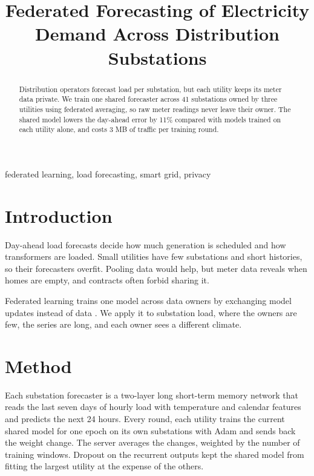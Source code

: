 \documentclass[conference]{IEEEtran}
\begin{document}
\title{Federated Forecasting of Electricity Demand Across Distribution Substations}
\author{}
\maketitle
\begin{abstract}
Distribution operators forecast load per substation, but each utility keeps its meter data private. We train one shared forecaster across 41 substations owned by three utilities using federated averaging, so raw meter readings never leave their owner. The shared model lowers the day-ahead error by 11\% compared with models trained on each utility alone, and costs 3 MB of traffic per training round.
\end{abstract}
\begin{IEEEkeywords}
federated learning, load forecasting, smart grid, privacy
\end{IEEEkeywords}
\section{Introduction}
Day-ahead load forecasts decide how much generation is scheduled and how transformers are loaded. Small utilities have
few substations and short histories, so their forecasters overfit. Pooling data would help, but meter data reveals
when homes are empty, and contracts often forbid sharing it.

Federated learning trains one model across data owners by exchanging model updates instead of data \cite{mcmahan}. We
apply it to substation load, where the owners are few, the series are long, and each owner sees a different climate.

\section{Method}
Each substation forecaster is a two-layer long short-term memory network \cite{hochreiter} that reads the last seven
days of hourly load with temperature and calendar features and predicts the next 24 hours. Every round, each utility
trains the current shared model for one epoch on its own substations with Adam \cite{kingma} and sends back the weight
change. The server averages the changes, weighted by the number of training windows. Dropout \cite{srivastava} on the
recurrent outputs kept the shared model from fitting the largest utility at the expense of the others.
\end{document}
